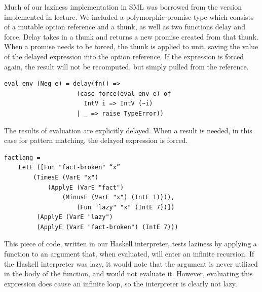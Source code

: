 \documentclass[journal]{IEEEtran}
\begin{document}
Much of our laziness implementation in SML was borrowed from the version implemented in lecture. We included a polymorphic promise type which consists of a mutable option reference and a thunk, as well as two functions delay and force. Delay takes in a thunk and returns a new promise created from that thunk. When a promise needs to be forced, the thunk is applied to unit, saving the value of the delayed expression into the option reference. If the expression is forced again, the result will not be recomputed, but simply pulled from the reference.
\small
\begin{verbatim}
eval env (Neg e) = delay(fn() => 
                    (case force(eval env e) of
                      IntV i => IntV (~i)
                    | _ => raise TypeError))

\end{verbatim}
\normalsize

The results of evaluation are explicitly delayed. When a result is needed, in this case for pattern matching, the delayed expression is forced. \\
\small
\begin{verbatim}
factlang =
    LetE ([Fun "fact-broken" “x”
        (TimesE (VarE "x") 
            (ApplyE (VarE "fact")
                (MinusE (VarE "x") (IntE 1)))), 
                    (Fun "lazy" "x" (IntE 7))])
         (ApplyE (VarE "lazy") 
         (ApplyE (VarE "fact-broken") (IntE 7))) 

\end{verbatim}
\normalsize

This piece of code, written in our Haskell interpreter, tests laziness by applying a function to an argument that, when evaluated, will enter an infinite recursion. If the Haskell interpreter was lazy, it would note that the argument is never utilized in the body of the function, and would not evaluate it. However, evaluating this expression does cause an infinite loop, so the interpreter is clearly not lazy.
\end{document}
